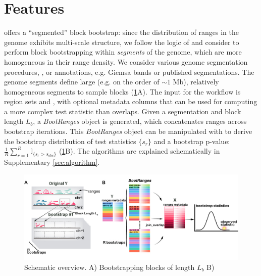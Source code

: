 \section{Features}

\bootranges offers a ``segmented'' block bootstrap:
since the distribution of ranges in the genome exhibits multi-scale
structure, we follow the logic of \citet{bickel2010subsampling} and consider to
perform block bootstrapping within \textit{segments} of the genome, which are
more homogeneous in their range density.
We consider various genome segmentation procedures, ,
or  annotations, e.g. Giemsa bands or published segmentations.
The genome segments define large (e.g. on the order of ${\sim}1$ Mb),
relatively homogeneous segments  to sample blocks
(\cref{fig:framework}A).
The input for the workflow is region sets  and
, with optional metadata columns that can be
used for computing a more complex test statistic than overlaps.
Given a segmentation and block length $L_b$, a \textit{BootRanges}
object is generated, which concatenates ranges across bootstrap
iterations. This \textit{BootRanges} object can be manipulated with \plyranges
to derive the bootstrap distribution of test statistics $\{s_r\}$ and a
bootstrap p-value:
$ \frac{1}{R} \sum_{r=1}^R \mathbb{I}_{\{s_r > s_\text{obs}\}} $ (\cref{fig:framework}B).
The \bootranges algorithms are explained schematically in Supplementary \cref{sec:algorithm}.

\begin{figure}[t]
\centering%
\setlength{\abovecaptionskip}{-0.05cm}
\includegraphics[scale=0.16]{Figures/bootRanges.jpg}
\caption{Schematic overview.
  A) Bootstrapping blocks of length $L_b$  
  B) } 
\label{fig:framework}
\end{figure}

